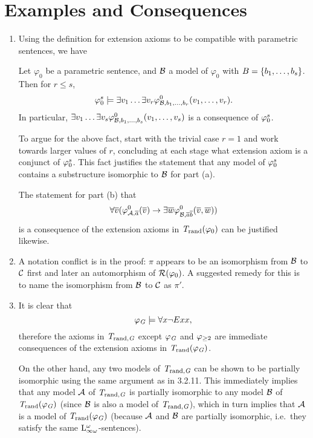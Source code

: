 \setcounter{section}{3}
\section{Examples and Consequences}
\begin{enumerate}[1.]
%
\item {} Using the definition for extension axioms to be compatible with parametric sentences, we have
\begin{fact}
Let $\varphi_0$ be a parametric sentence, and $\mathcal{B}$ a model of $\varphi_0$ with $B = {\{b_1, \ldots, b_s\}}$. Then for $r \leq s$,
\[
\conjextaxm[\varphi_0]{s} \consq \exists v_1 \etc \exists v_r \hint{0}{\strct{B}, b_1, \etc, b_r}(v_1, \etc, v_r).
\]
In particular, $\exists v_1 \ldots \exists v_s \varphi^{0}_{\mathcal{B}, b_1, \ldots, b_s}(v_1, \ldots, v_s)$ is a consequence of $\conjextaxm[\varphi_0]{s}$.
\end{fact}
To argue for the above fact, start with the trivial case $r = 1$ and work towards larger values of $r$, concluding at each stage what extension axiom is a conjunct of $\conjextaxm[\varphi_0]{s}$. This fact justifies the statement that any model of $\conjextaxm[\varphi_0]{s}$ contains a substructure isomorphic to $\mathcal{B}$ for part (a).

The statement for part (b) that
\[
\forall \overline{v}(\varphi^{0}_{\mathcal{A}, \overline{a}}(\overline{v}) \rightarrow \exists \overline{w} \varphi^{0}_{\mathcal{B}, \overline{a}\overline{b}}(\overline{v}, \overline{w}))
\]
is a consequence of the extension axioms in $\mathit{T}_{\mathrm{rand}}(\varphi_0)$ can be justified likewise.
%
\item {} A notation conflict is in the proof: $\pi$ appears to be an isomorphism from $\mathcal{B}$ to $\mathcal{C}$ first and later an automorphism of $\mathcal{R}(\varphi_0)$. A suggested remedy for this is to name the isomorphism from $\mathcal{B}$ to $\mathcal{C}$ as $\pi'$.
%
\item {} It is clear that
\[
\varphi_{\mathit{G}} \models \forall x \neg Exx,
\]
therefore the axioms in $\mathit{T}_{\mathrm{rand}, \mathit{G}}$ except $\varphi_{\mathit{G}}$ and $\varphi_{\geq 2}$ are immediate consequences of the extension axioms in $\mathit{T}_{\mathrm{rand}}(\varphi_{\mathit{G}})$.

On the other hand, any two models of $\mathit{T}_{\mathrm{rand}, \mathit{G}}$ can be shown to be partially isomorphic using the same argument as in 3.2.11. This immediately implies that any model $\mathcal{A}$ of $\mathit{T}_{\mathrm{rand}, \mathit{G}}$ is partially isomorphic to any model $\mathcal{B}$ of $\mathit{T}_{\mathrm{rand}}(\varphi_{\mathit{G}})$ (since $\mathcal{B}$ is also a model of $\mathit{T}_{\mathrm{rand}, \mathit{G}}$), which in turn implies that $\mathcal{A}$ is a model of $\mathit{T}_{\mathrm{rand}}(\varphi_{\mathit{G}})$ (because $\mathcal{A}$ and $\mathcal{B}$ are partially isomorphic, i.e.\ they satisfy the same $\inflog[\omega]$-sentences).
%
\end{enumerate}


